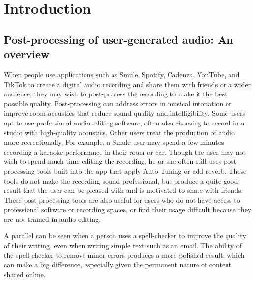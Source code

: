 \chapter{Introduction}
\label{sec:thesis-intro}

\section{Post-processing of user-generated audio: An overview}
\label{sec:challenges-intro}
When people use applications such as Smule, Spotify, Cadenza, YouTube, and TikTok to create a digital audio recording and share them with friends or a wider audience, they may wish to post-process the recording to make it the best possible quality. Post-processing can address errors in musical intonation or improve room acoustics that reduce sound quality and intelligibility. Some users opt to use professional audio-editing software, often also choosing to record in a studio with high-quality acoustics. Other users treat the production of audio more recreationally. For example, a Smule user may spend a few minutes recording a karaoke performance in their room or car. Though the user may not wish to spend much time editing the recording, he or she often still uses post-processing tools built into the app that apply Auto-Tuning or add reverb. These tools do not make the recording sound professional, but produce a quite good result that the user can be pleased with and is motivated to share with friends. These post-processing tools are also useful for users who do not have access to professional software or recording spaces, or find their usage difficult because they are not trained in audio editing. 
    
A parallel can be seen when a person uses a spell-checker to improve the quality of their writing, even when writing simple text such as an email. The ability of the spell-checker to remove minor errors produces a more polished result, which can make a big difference, especially given the permanent nature of content shared online.

